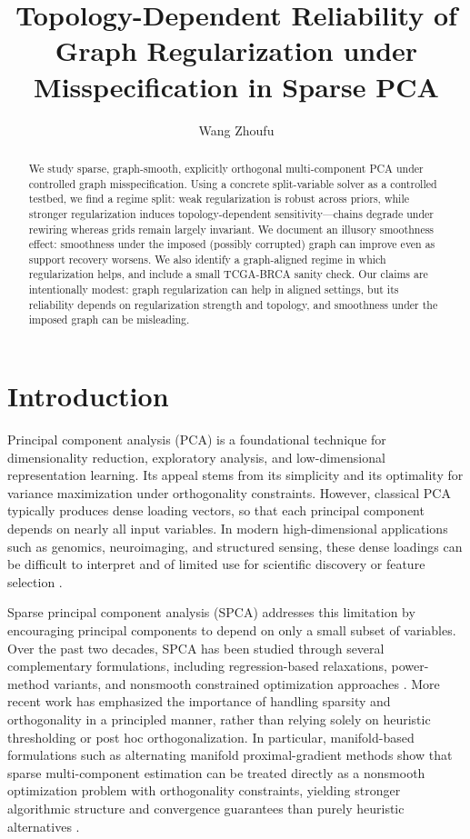 \documentclass[10pt,twocolumn,letterpaper]{article}
\title{\texorpdfstring{Topology-Dependent Reliability of Graph Regularization under Misspecification in Sparse PCA}{Topology-Dependent Reliability of Graph Regularization under Misspecification in Sparse PCA}}
\author{Wang Zhoufu}
\date{}
\theoremstyle{definition}
\begin{document}
\sloppy
\raggedbottom
\maketitle

\begin{abstract}
We study sparse, graph-smooth, explicitly orthogonal multi-component PCA under controlled graph misspecification. Using a concrete split-variable solver as a controlled testbed, we find a regime split: weak regularization is robust across priors, while stronger regularization induces topology-dependent sensitivity---chains degrade under rewiring whereas grids remain largely invariant. We document an illusory smoothness effect: smoothness under the imposed (possibly corrupted) graph can improve even as support recovery worsens. We also identify a graph-aligned regime in which regularization helps, and include a small TCGA-BRCA sanity check. Our claims are intentionally modest: graph regularization can help in aligned settings, but its reliability depends on regularization strength and topology, and smoothness under the imposed graph can be misleading.
\end{abstract}

\section{Introduction}
\label{sec:introduction}

Principal component analysis (PCA) is a foundational technique for dimensionality reduction, exploratory analysis, and low-dimensional representation learning. Its appeal stems from its simplicity and its optimality for variance maximization under orthogonality constraints. However, classical PCA typically produces dense loading vectors, so that each principal component depends on nearly all input variables. In modern high-dimensional applications such as genomics, neuroimaging, and structured sensing, these dense loadings can be difficult to interpret and of limited use for scientific discovery or feature selection \cite{zou2006spca,chen2020amanpg}.

Sparse principal component analysis (SPCA) addresses this limitation by encouraging principal components to depend on only a small subset of variables. Over the past two decades, SPCA has been studied through several complementary formulations, including regression-based relaxations, power-method variants, and nonsmooth constrained optimization approaches \cite{zou2006spca,journee2010gpower,chen2020amanpg}. More recent work has emphasized the importance of handling sparsity and orthogonality in a principled manner, rather than relying solely on heuristic thresholding or post hoc orthogonalization. In particular, manifold-based formulations such as alternating manifold proximal-gradient methods show that sparse multi-component estimation can be treated directly as a nonsmooth optimization problem with orthogonality constraints, yielding stronger algorithmic structure and convergence guarantees than purely heuristic alternatives \cite{chen2020amanpg,chen2024nonsmoothstiefel}.
\end{document}
